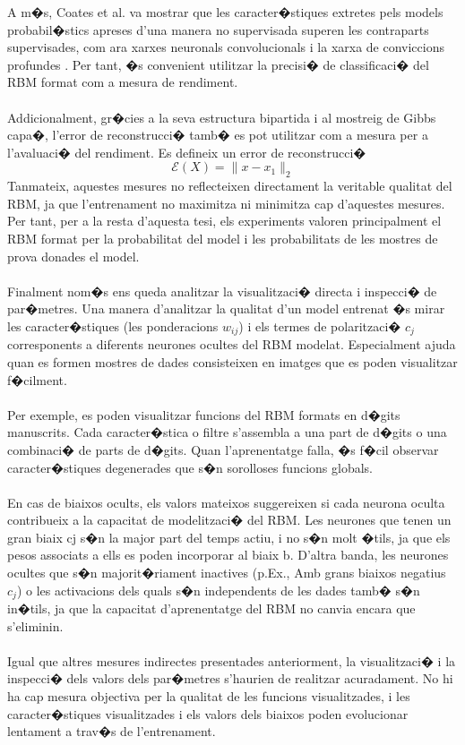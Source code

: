 \documentclass[12pt,a4paper,openright,oneside]{article}
\numberwithin{equation}{section}
\theoremstyle{definition}
\begin{document}
A m�s, Coates et al. va mostrar que les caracter�stiques extretes pels models probabil�stics apreses d'una manera no supervisada superen les contraparts supervisades, com ara xarxes neuronals convolucionals i la xarxa de conviccions profundes .
Per tant, �s convenient utilitzar la precisi� de classificaci� del RBM format com a mesura de rendiment.\\\\
Addicionalment, gr�cies a la seva estructura bipartida i al mostreig de Gibbs capa�, l'error de reconstrucci� tamb� es pot utilitzar com a mesura per a l'avaluaci� del rendiment. Es defineix un error de reconstrucci�
\[\mathcal{E}(X) = \parallel x-x_1 \parallel_2\]
Tanmateix, aquestes mesures no reflecteixen directament la veritable qualitat del RBM, ja que l'entrenament no maximitza ni minimitza cap d'aquestes mesures. Per tant, per a la resta d'aquesta tesi, els experiments valoren principalment el RBM format per la probabilitat del model i les probabilitats de les mostres de prova donades el model.\\\\
Finalment nom�s ens queda analitzar la visualitzaci� directa i inspecci� de par�metres. Una manera d'analitzar la qualitat d'un model entrenat �s mirar les caracter�stiques (les ponderacions ${w_{ij}}$) i els termes de polaritzaci� ${c_j}$ corresponents a diferents neurones ocultes del RBM modelat. Especialment ajuda quan es formen mostres de dades consisteixen en imatges que es poden visualitzar f�cilment.\\\\
Per exemple, es poden visualitzar funcions del RBM formats en d�gits manuscrits. Cada caracter�stica o filtre s'assembla a una part de d�gits o una combinaci� de parts de d�gits. Quan l'aprenentatge falla, �s f�cil observar caracter�stiques degenerades que s�n sorolloses funcions globals.\\\\
En cas de biaixos ocults, els valors mateixos suggereixen si cada neurona oculta contribueix a la capacitat de modelitzaci� del RBM. Les neurones que tenen un gran biaix cj s�n la major part del temps actiu, i no s�n molt �tils, ja que els pesos associats a ells es poden incorporar al biaix b. D'altra banda, les neurones ocultes que s�n majorit�riament inactives (p.Ex., Amb grans biaixos negatius ${c_j}$) o les activacions dels quals s�n independents de les dades tamb� s�n in�tils, ja que la capacitat d'aprenentatge del RBM no canvia encara que s'eliminin.\\\\
Igual que altres mesures indirectes presentades anteriorment, la visualitzaci� i la inspecci� dels valors dels par�metres s'haurien de realitzar acuradament. No hi ha cap mesura objectiva per la qualitat de les funcions visualitzades, i les caracter�stiques visualitzades i els valors dels biaixos poden evolucionar lentament a trav�s de l'entrenament.\\\\
\end{document}
